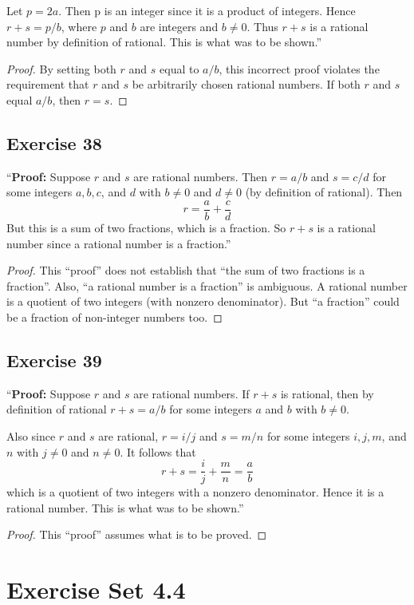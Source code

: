 \documentclass[14pt]{extarticle}
\begin{document}
Let $p = 2a$. Then p is an integer since it is a product of integers. Hence $r + s = p/b$, where $p$ and $b$ are integers and $b \neq 0$. Thus $r + s$ is a rational number by definition of rational. This is what was to be shown.”

\begin{proof}
By setting both $r$ and $s$ equal to $a/b$, this incorrect proof violates the requirement that $r$ and $s$ be arbitrarily chosen rational numbers. If both $r$ and $s$ equal $a/b$, then $r=s$.
\end{proof}

\subsection{Exercise 38}
“{\bf Proof:} Suppose $r$ and $s$ are rational numbers. Then $r = a/b$ and $s = c/d$ for some integers $a, b, c$, and $d$ with $b \neq 0$ and $d \neq 0$ (by definition of rational). Then
\[
r = \frac{a}{b}+\frac{c}{d}
\]
But this is a sum of two fractions, which is a fraction. So $r + s$ is a rational number since a rational number is a fraction.”

\begin{proof}
This ``proof'' does not establish that ``the sum of two fractions is a fraction''. Also, ``a rational number is a fraction'' is ambiguous. A rational number is a quotient of two integers (with nonzero denominator). But ``a fraction'' could be a fraction of non-integer numbers too. 
\end{proof}

\subsection{Exercise 39}
“{\bf Proof:} Suppose $r$ and $s$ are rational numbers. If $r + s$ is rational, then by definition of rational $r + s = a/b$ for some integers $a$ and $b$ with $b \neq 0$. 

Also since $r$ and $s$ are rational, $r = i/j$ and $s = m/n$ for some integers $i, j, m$, and $n$ with $j \neq 0$ and $n \neq 0$. It follows that
\[
r+s = \frac{i}{j} + \frac{m}{n} = \frac{a}{b}
\]
which is a quotient of two integers with a nonzero denominator. Hence it is a rational number. This is what was to be shown.”

\begin{proof}
This ``proof'' assumes what is to be proved.
\end{proof}

\section{Exercise Set 4.4}
\end{document}

